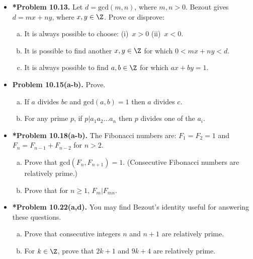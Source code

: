 \documentclass[11pt]{article}
\begin{document}
\begin{itemize}
\vspace{0.1in}

\item \textbf{*Problem 10.13.}
Let $d=\text{gcd}(m,n)$, where $m,n>0$.
Bezout gives $d=mx+ny$, where $x,y\in\Z$.
Prove or disprove:
\begin{enumerate}[(a)]
\item It is always possible to choose: (i)~$x>0$ (ii)~$x<0$.
\item It is possible to find another $x,y\in\Z$ for which $0<mx+ny<d$.
\item It is always possible to find $a,b\in\Z$ for which $ax+by=1$.
\end{enumerate}

\vspace{0.1in}

\item \textbf{Problem 10.15(a-b).}
Prove.
\begin{enumerate}[(a)]
\item If $a$ divides $bc$ and $\text{gcd}(a,b)=1$ then $a$ divides $c$.
\item For any prime $p$, if $p|a_1a_2\ldots a_n$ then $p$ divides one of the $a_i$.
\end{enumerate}

\vspace{0.1in}

\item \textbf{*Problem 10.18(a-b).}
The Fibonacci numbers are: $F_1=F_2=1$ and $F_n=F_{n-1}+F_{n-2}$ for $n>2$.
\begin{enumerate}[(a)]
\item Prove that $\text{gcd}(F_n,F_{n+1})=1$.
  (Consecutive Fibonacci numbers are relatively prime.)
\item Prove that for $n\ge 1$, $F_m|F_{mn}$.
\end{enumerate}

\vspace{0.1in}

\item \textbf{*Problem 10.22(a,d).}
You may find Bezout's identity useful for answering these questions.
\begin{enumerate}[(a)]
\item Prove that consecutive integers $n$ and $n+1$ are relatively prime.
\setcounter{enumi}{3}
\item For $k\in\Z$, prove that $2k+1$ and $9k+4$ are relatively prime.
\end{enumerate}


\end{itemize}
\end{document}
